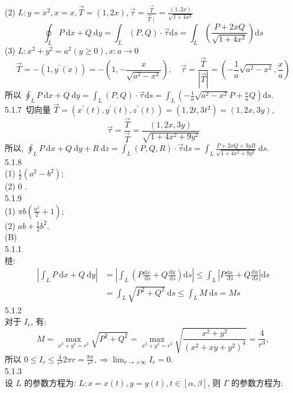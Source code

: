 \documentclass[a4paper,11pt,UTF8]{article}
\begin{document}
(2) $L: y=x^2, x=x, \vec{T}=(1,2 x), \vec{\tau}=\frac{\vec{T}}{\vec{T} \mid}=\frac{(1,2 x)}{\sqrt{1+4 x^2}}$
$$
\oint_L P \mathrm{~d} x+Q \mathrm{~d} y=\int_L(P, Q) \cdot \vec{\tau} \mathrm{d} s=\int_L\left(\frac{P+2 x Q}{\sqrt{1+4 x^2}}\right) \mathrm{d} s
$$
(3) $L: x^2+y^2=a^2(y \geq 0), x: a \rightarrow 0$
$$
\vec{T}=-\left(1, y^{\prime}(x)\right)=-\left(1,-\frac{x}{\sqrt{a^2-x^2}}\right), \quad \vec{\tau}=\frac{\vec{T}}{|\vec{T}|}=\left(-\frac{1}{a} \sqrt{a^2-x^2}, \frac{x}{a}\right)
$$
所以 $\oint_L P \mathrm{~d} x+Q \mathrm{~d} y=\int_L(P, Q) \cdot \vec{\tau} \mathrm{d} s=\int_L\left(-\frac{1}{a} \sqrt{a^2-x^2} P+\frac{x}{a} Q\right) \mathrm{d} s$.\\
5.1.7\
切向量 $\vec{T}=\left(x^{\prime}(t), y^{\prime}(t), z^{\prime}(t)\right)=\left(1,2 t, 3 t^2\right)=(1,2 x, 3 y)$,
$$
\vec{\tau}=\frac{\vec{T}}{\vec{T}}=\frac{(1,2 x, 3 y)}{\sqrt{1+4 x^2+9 y^2}}
$$
所以, $\oint_L P \mathrm{~d} x+Q \mathrm{~d} y+R \mathrm{~d} z=\int_L(P, Q, R) \cdot \vec{\tau} \mathrm{d} s=\int_L \frac{P+2 x Q+3 y R}{\sqrt{1+4 x^2+9 y^2}} \mathrm{~d} s$.\\
5.1.8\\
(1) $\frac{1}{2}\left(a^2-b^2\right)$;\\
(2) 0 .\\
5.1.9\\
(1) $\pi b\left(\frac{a^2}{2}+1\right)$;\\
(2) $a b+\frac{1}{2} b^2$.\\
(B)\\
5.1.1\\
梿:
$$
\begin{aligned}
	\left|\int_L P \mathrm{~d} x+Q \mathrm{~d} y\right| & =\left|\int_L\left(P \frac{\mathrm{d} x}{\mathrm{~d} s}+Q \frac{\mathrm{d} y}{\mathrm{~d} s}\right) \mathrm{d} s\right| \leq \int_L\left|P \frac{\mathrm{d} x}{\mathrm{~d} s}+Q \frac{\mathrm{d} y}{\mathrm{~d} s}\right| \mathrm{d} s \\
	& =\int_L \sqrt{P^2+Q^2} \mathrm{~d} s \leq \int_L M \mathrm{~d} s=M s
\end{aligned}
$$
5.1.2\\
对于 $I_r$, 有:
$$
M=\max _{x^2+y^2=r^2} \sqrt{P^2+Q^2}=\max _{x^2+y^2=r^2} \sqrt{\frac{x^2+y^2}{\left(x^2+x y+y^2\right)^4}}=\frac{4}{r^3},
$$
所以 $0 \leq I_r \leq \frac{4}{r^3} 2 \pi r=\frac{8 \pi}{r^2}, \Rightarrow \lim _{r \rightarrow+\infty} I_r=0$.\\
5.1.3\\
设 $L$ 的参数方程为: $L: x=x(t), y=y(t), t \in[\alpha, \beta]$, 则 $\Gamma$ 的参数方程为:
\end{document}
